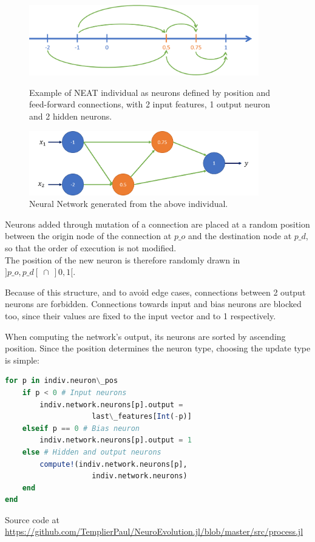 \begin{figure}[H]
\centering
\captionsetup{justification=centering,margin=2cm}
\includegraphics[width=10cm]{images/NEAT_position.png}
\caption{Example of NEAT individual as neurons defined by position and feed-forward connections, with 2 input features, 1 output neuron and 2 hidden neurons.}
\includegraphics[width=10cm]{images/NEAT_network.png}
\caption{Neural Network generated from the above individual.}
 \label{NEAT_network}
\end{figure}

Neurons added through mutation of a connection are placed at a random position between the origin node of the connection at $p\_o$ and the destination node at $p\_d$, so that the order of execution is not modified. \\
The position of the new neuron is therefore randomly drawn in $]p\_o, p\_d[ \: \cap \: ]0, 1[$.

Because of this structure, and to avoid edge cases, connections between 2 output neurons are forbidden. Connections towards input and bias neurons are blocked too, since their values are fixed to the input vector and to 1 respectively.

When computing the network's output, its neurons are sorted by ascending position. Since the position determines the neuron type, choosing the update type is simple:

\begin{minipage}{\linewidth}
\begin{lstlisting}[language=Julia, caption=NEAT network processing]
for p in indiv.neuron\_pos
    if p < 0 # Input neurons
        indiv.network.neurons[p].output = 
                    last\_features[Int(-p)]
    elseif p == 0 # Bias neuron
        indiv.network.neurons[p].output = 1
    else # Hidden and output neurons
        compute!(indiv.network.neurons[p], 
                    indiv.network.neurons)
    end
end
\end{lstlisting}
Source code at \url{https://github.com/TemplierPaul/NeuroEvolution.jl/blob/master/src/process.jl}\\
\end{minipage}

